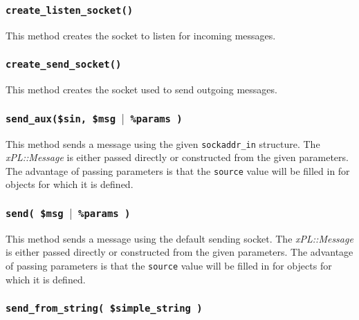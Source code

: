 \subsubsection*{\texttt{create\_listen\_socket()}\label{xPL::Listener_create_listen_socket_}}


This method creates the socket to listen for incoming messages.

\subsubsection*{\texttt{create\_send\_socket()}\label{xPL::Listener_create_send_socket_}}


This method creates the socket used to send outgoing messages.

\subsubsection*{\texttt{send\_aux(\$sin, \$msg $|$ \%params )}\label{xPL::Listener_send_aux_sin_msg_params_}}


This method sends a message using the given \texttt{sockaddr\_in} structure.
The \emph{xPL::Message} is either passed directly or constructed from the
given parameters.  The advantage of passing parameters is that the
\texttt{source} value will be filled in for objects for which it is defined.

\subsubsection*{\texttt{send( \$msg $|$ \%params )}\label{xPL::Listener_send_msg_params_}}


This method sends a message using the default sending socket.  The
\emph{xPL::Message} is either passed directly or constructed from the
given parameters.  The advantage of passing parameters is that the
\texttt{source} value will be filled in for objects for which it is defined.

\subsubsection*{\texttt{send\_from\_string( \$simple\_string )}\label{xPL::Listener_send_from_string_simple_string_}}


